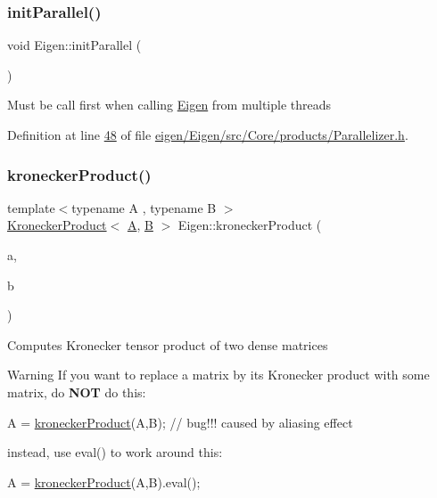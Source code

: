 \subsubsection{\texorpdfstring{init\+Parallel()}{initParallel()}}
{\footnotesize\ttfamily void Eigen\+::init\+Parallel (\begin{DoxyParamCaption}{ }\end{DoxyParamCaption})\hspace{0.3cm}{\ttfamily [inline]}}

Must be call first when calling \hyperlink{namespace_eigen}{Eigen} from multiple threads 

Definition at line \hyperlink{eigen_2_eigen_2src_2_core_2products_2_parallelizer_8h_source_l00048}{48} of file \hyperlink{eigen_2_eigen_2src_2_core_2products_2_parallelizer_8h_source}{eigen/\+Eigen/src/\+Core/products/\+Parallelizer.\+h}.

\mbox{\label{namespace_eigen_aedd4b7cd1e324ed0769cac2701f4d050}} 
\subsubsection{\texorpdfstring{kronecker\+Product()}{kroneckerProduct()}\hspace{0.1cm}{\footnotesize\ttfamily [1/2]}}
{\footnotesize\ttfamily template$<$typename A , typename B $>$ \\
\hyperlink{class_eigen_1_1_kronecker_product}{Kronecker\+Product}$<$ \hyperlink{group___core___module_class_eigen_1_1_matrix}{A}, \hyperlink{group___core___module_class_eigen_1_1_matrix}{B} $>$ Eigen\+::kronecker\+Product (\begin{DoxyParamCaption}\item[{const \hyperlink{group___core___module_class_eigen_1_1_matrix_base}{Matrix\+Base}$<$ \hyperlink{group___core___module_class_eigen_1_1_matrix}{A} $>$ \&}]{a,  }\item[{const \hyperlink{group___core___module_class_eigen_1_1_matrix_base}{Matrix\+Base}$<$ \hyperlink{group___core___module_class_eigen_1_1_matrix}{B} $>$ \&}]{b }\end{DoxyParamCaption})}

Computes Kronecker tensor product of two dense matrices

\begin{DoxyWarning}{Warning}
If you want to replace a matrix by its Kronecker product with some matrix, do {\bfseries N\+OT} do this\+: 
\begin{DoxyCode}
A = \hyperlink{namespace_eigen_aedd4b7cd1e324ed0769cac2701f4d050}{kroneckerProduct}(A,B); \textcolor{comment}{// bug!!! caused by aliasing effect}
\end{DoxyCode}
 instead, use eval() to work around this\+: 
\begin{DoxyCode}
A = \hyperlink{namespace_eigen_aedd4b7cd1e324ed0769cac2701f4d050}{kroneckerProduct}(A,B).eval();
\end{DoxyCode}

\end{DoxyWarning}

